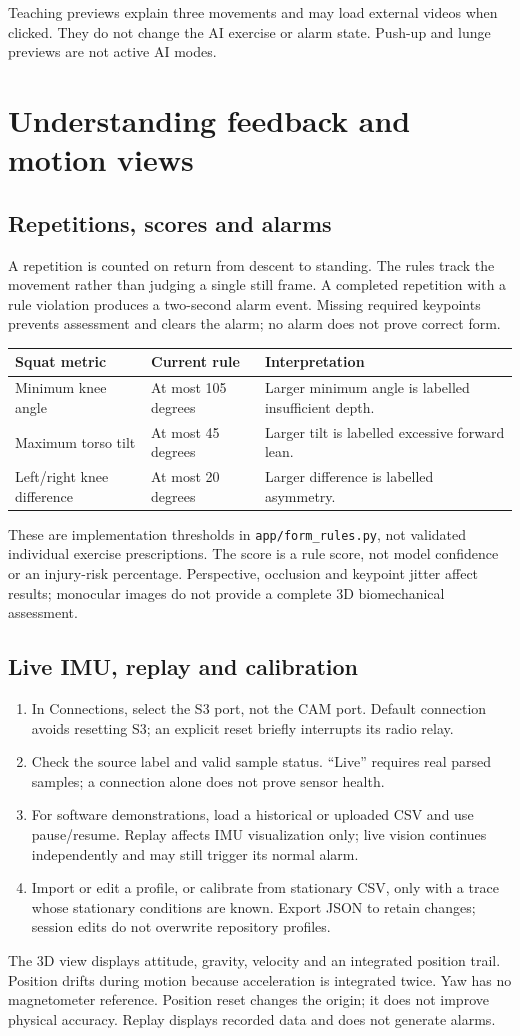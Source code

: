 \documentclass[11pt,a4paper]{article}
\newcommand{\file}[1]{\nolinkurl{#1}}
\newcommand{\page}[1]{\clearpage\section{#1}}
\begin{document}
Teaching previews explain three movements and may load external videos when clicked. They do not change the AI exercise or alarm state. Push-up and lunge previews are not active AI modes.
\page{Understanding feedback and motion views}
\subsection{Repetitions, scores and alarms}
A repetition is counted on return from descent to standing. The rules track the movement rather than judging a single still frame. A completed repetition with a rule violation produces a two-second alarm event. Missing required keypoints prevents assessment and clears the alarm; no alarm does not prove correct form.
\par\begin{tabularx}{\linewidth}{@{}l l X@{}}\toprule
Squat metric & Current rule & Interpretation\\\midrule
Minimum knee angle & At most 105 degrees & Larger minimum angle is labelled insufficient depth.\\
Maximum torso tilt & At most 45 degrees & Larger tilt is labelled excessive forward lean.\\
Left/right knee difference & At most 20 degrees & Larger difference is labelled asymmetry.\\\bottomrule
\end{tabularx}
These are implementation thresholds in \file{app/form_rules.py}, not validated individual exercise prescriptions. The score is a rule score, not model confidence or an injury-risk percentage. Perspective, occlusion and keypoint jitter affect results; monocular images do not provide a complete 3D biomechanical assessment.
\subsection{Live IMU, replay and calibration}
\begin{enumerate}
\item In Connections, select the S3 port, not the CAM port. Default connection avoids resetting S3; an explicit reset briefly interrupts its radio relay.
\item Check the source label and valid sample status. ``Live'' requires real parsed samples; a connection alone does not prove sensor health.
\item For software demonstrations, load a historical or uploaded CSV and use pause/resume. Replay affects IMU visualization only; live vision continues independently and may still trigger its normal alarm.
\item Import or edit a profile, or calibrate from stationary CSV, only with a trace whose stationary conditions are known. Export JSON to retain changes; session edits do not overwrite repository profiles.
\end{enumerate}
The 3D view displays attitude, gravity, velocity and an integrated position trail. Position drifts during motion because acceleration is integrated twice. Yaw has no magnetometer reference. Position reset changes the origin; it does not improve physical accuracy. Replay displays recorded data and does not generate alarms.
\end{document}

